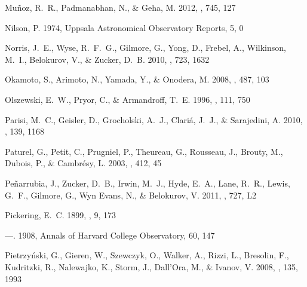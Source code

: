 \documentclass[manuscript]{aastex}
\begin{document}
\begin{thebibliography}{381}
{Mu{\~n}oz}, R.~R., {Padmanabhan}, N., \& {Geha}, M. 2012, \apj, 745, 127

{Nilson}, P. 1974, Uppsala Astronomical Observatory Reports, 5, 0

{Norris}, J.~E., {Wyse}, R.~F.~G., {Gilmore}, G., {Yong}, D., {Frebel}, A.,
  {Wilkinson}, M.~I., {Belokurov}, V., \& {Zucker}, D.~B. 2010, \apj, 723, 1632

{Okamoto}, S., {Arimoto}, N., {Yamada}, Y., \& {Onodera}, M. 2008, \aap, 487,
  103

{Olszewski}, E.~W., {Pryor}, C., \& {Armandroff}, T.~E. 1996, \aj, 111, 750

{Parisi}, M.~C., {Geisler}, D., {Grocholski}, A.~J., {Clari{\'a}}, J.~J., \&
  {Sarajedini}, A. 2010, \aj, 139, 1168

{Paturel}, G., {Petit}, C., {Prugniel}, P., {Theureau}, G., {Rousseau}, J.,
  {Brouty}, M., {Dubois}, P., \& {Cambr{\'e}sy}, L. 2003, \aap, 412, 45

{Pe{\~n}arrubia}, J., {Zucker}, D.~B., {Irwin}, M.~J., {Hyde}, E.~A., {Lane},
  R.~R., {Lewis}, G.~F., {Gilmore}, G., {Wyn Evans}, N., \& {Belokurov}, V.
  2011, \apjl, 727, L2

{Pickering}, E.~C. 1899, \apj, 9, 173

---. 1908, Annals of Harvard College Observatory, 60, 147

{Pietrzy{\'n}ski}, G., {Gieren}, W., {Szewczyk}, O., {Walker}, A., {Rizzi}, L.,
  {Bresolin}, F., {Kudritzki}, R., {Nalewajko}, K., {Storm}, J., {Dall'Ora},
  M., \& {Ivanov}, V. 2008, \aj, 135, 1993


\end{thebibliography}
\end{document}
